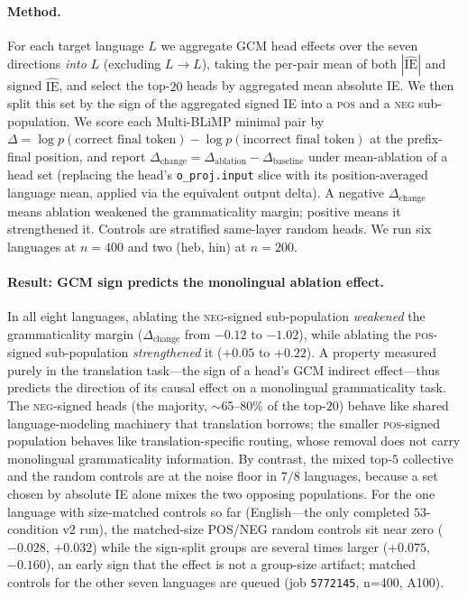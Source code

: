 \documentclass[11pt]{article}
\begin{document}
\paragraph{Method.} For each target language $L$ we aggregate GCM head effects
over the seven directions \emph{into} $L$ (excluding $L\!\to\!L$), taking the
per-pair mean of both $|\widehat{\mathrm{IE}}|$ and signed
$\widehat{\mathrm{IE}}$, and select the top-$20$ heads by aggregated mean
absolute IE. We then split this set by the sign of the aggregated signed IE into
a \textsc{pos} and a \textsc{neg} sub-population. We score each Multi-BLiMP
minimal pair by $\Delta = \log p(\text{correct final token}) -
\log p(\text{incorrect final token})$ at the prefix-final position, and report
$\Delta_{\text{change}} = \Delta_{\text{ablation}} - \Delta_{\text{baseline}}$
under mean-ablation of a head set (replacing the head's \texttt{o\_proj.input}
slice with its position-averaged language mean, applied via the equivalent
output delta). A negative $\Delta_{\text{change}}$ means ablation weakened the
grammaticality margin; positive means it strengthened it. Controls are
stratified same-layer random heads. We run six languages at $n{=}400$ and two
(heb, hin) at $n{=}200$.

\paragraph{Result: GCM sign predicts the monolingual ablation effect.} In all
eight languages, ablating the \textsc{neg}-signed sub-population
\emph{weakened} the grammaticality margin ($\Delta_{\text{change}}$ from $-0.12$
to $-1.02$), while ablating the \textsc{pos}-signed sub-population
\emph{strengthened} it ($+0.05$ to $+0.22$). A property measured purely in the
translation task---the sign of a head's GCM indirect effect---thus predicts the
direction of its causal effect on a monolingual grammaticality task. The
\textsc{neg}-signed heads (the majority, $\sim$65--80\% of the top-$20$) behave
like shared language-modeling machinery that translation borrows; the smaller
\textsc{pos}-signed population behaves like translation-specific routing, whose
removal does not carry monolingual grammaticality information. By contrast, the
mixed top-$5$ collective and the random controls are at the noise floor in
$7/8$ languages, because a set chosen by absolute IE alone mixes the two
opposing populations. For the one language with size-matched controls so far
(English---the only completed $53$-condition v2 run), the matched-size POS/NEG
random controls sit near zero ($-0.028$, $+0.032$) while the sign-split groups
are several times larger ($+0.075$, $-0.160$), an early sign that the effect is
not a group-size artifact; matched controls for the other seven languages are
queued (job \texttt{5772145}, n=400, A100).
\end{document}

